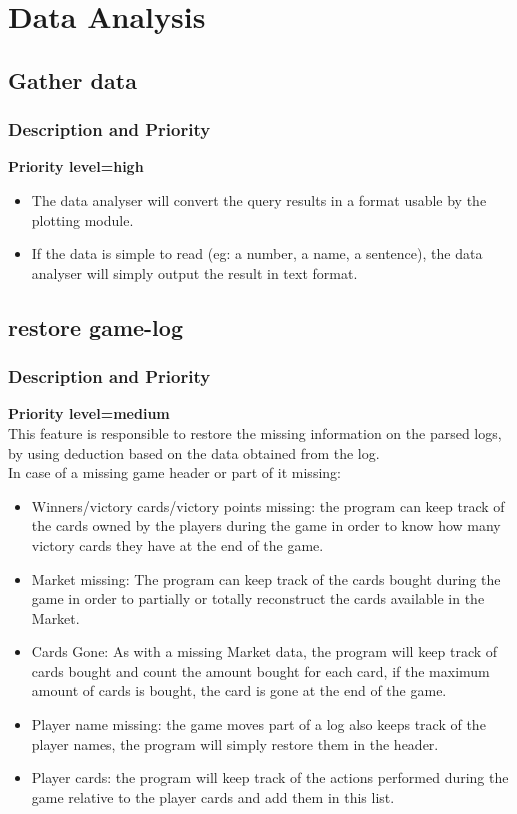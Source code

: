\documentclass{scrreprt}
\begin{document}
\section{Data Analysis}


\subsection{Gather data}
\subsubsection{Description and Priority}
\textbf{Priority level=high}\\
\begin{itemize}
\item The data analyser will convert the query results in a format usable by the plotting module.
\item If the data is simple to read (eg: a number, a name, a sentence), the data analyser will simply output the result in text format.
  \end{itemize}

\subsection{restore game-log}
\subsubsection{Description and Priority}
\textbf{Priority level=medium}\\
This feature is responsible to restore the missing information on the parsed
logs, by using deduction based on the data obtained from the log.\\
In case of a missing game header or part of it missing:
  \begin{itemize}
  \item Winners/victory cards/victory points missing: the program can keep track of the cards owned by the players during the game in order to know how many victory cards they have at the end of the game.
  \item Market missing: The program can keep track of the cards bought during the game in order to partially or totally reconstruct the cards available in the Market.
  \item Cards Gone: As with a missing Market data, the program will keep track of cards bought and count the amount bought for each card, if the maximum amount of cards is bought, the card is gone at the end of the game.
  \item Player name missing: the game moves part of a log also keeps track of the player names, the program will simply restore them in the header.
  \item Player cards: the program will keep track of the actions performed during the game relative to the player cards and add them in this list.
  \end{itemize}
\end{document}
